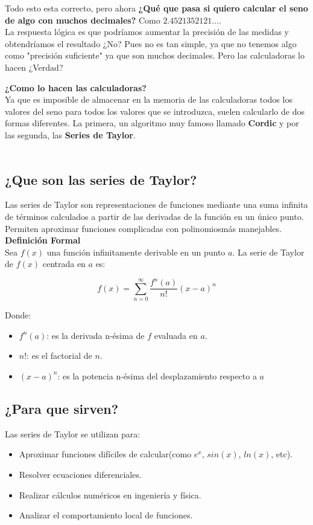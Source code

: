 \documentclass[12pt, a4paper, oneside]{article}
\begin{document}
Todo esto esta correcto, pero ahora
\textbf{¿Qué que pasa si quiero calcular el seno de algo
con muchos decimales?} Como $2.4521352121....$\\

La respuesta lógica es que podríamos aumentar la precisión de las
medidas y obtendríamos el resultado ¿No? Pues no es tan simple, ya 
que no tenemos algo como "precisión suficiente" ya que son muchos
decimales. Pero las calculadoras lo hacen ¿Verdad?\\
\par

\textbf{¿Como lo hacen las calculadoras?}\\
Ya que es imposible de almacenar en la memoria de las calculadoras todos
los valores del seno para todos los valores que se introduzca, suelen
calcularlo de dos formas diferentes. La primera, un algoritmo muy famoso
llamado \textbf{Cordic} y por las segunda, las \textbf{Series de Taylor}.
\\
\\

\subsection{¿Que son las series de Taylor?}

Las series de Taylor son representaciones de funciones mediante una suma infinita de términos calculados a partir de las derivadas de la función en un único punto. Permiten aproximar funciones complicadas con polinomiosmás manejables.\\

{\large\textbf{Definición Formal}}\\
Sea $f(x)$ una función infinitamente derivable en un punto $a$. La serie de Taylor de $f(x)$ centrada en $a$ es:

\begingroup
\Large
\begin{equation*}
  f(x) = \sum_{n=0}^\infty \frac{f^n(a)}{n!}(x-a)^n
\end{equation*}
\endgroup

Donde:
\begin{itemize}
  \item $f^n(a)$: es la derivada n-ésima de $f$ evaluada en $a$.
  \item $n!$: es el factorial de $n$.
  \item $(x-a)^n$: es la potencia n-ésima del desplazamiento respecto a $a$
\end{itemize}

\subsection{¿Para que sirven?}
Las series de Taylor se utilizan para:
\begin{itemize}
  \item Aproximar funciones difíciles de calcular(como $e^x$, $sin(x)$, $ln(x)$, etc).
  \item Resolver ecuaciones diferenciales.
  \item Realizar cálculos numéricos en ingeniería y física.
  \item Analizar el comportamiento local de funciones.
\end{itemize}
\end{document}
